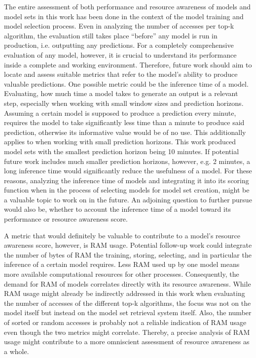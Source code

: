 The entire assessment of both performance and resource awareness of models and model sets in this work has been done in the context of the model training and model selection process. Even in analyzing the number of accesses per top-k algorithm, the evaluation still takes place “before” any model is run in production, i.e. outputting any predictions. For a completely comprehensive evaluation of any model, however, it is crucial to understand its performance inside a complete and working environment. Therefore, future work should aim to locate and assess suitable metrics that refer to the model's ability to produce valuable predictions. One possible metric could be the inference time of a model. Evaluating, how much time a model takes to generate an output is a relevant step, especially when working with small window sizes and prediction horizons. Assuming a certain model is supposed to produce a prediction every minute, requires the model to take significantly less time than a minute to produce said prediction, otherwise its informative value would be of no use. This additionally applies to when working with small prediction horizons. This work produced model sets with the smallest prediction horizon being 10 minutes. If potential future work includes much smaller prediction horizons, however, e.g. 2 minutes, a long inference time would significantly reduce the usefulness of a model. For these reasons, analyzing the inference time of models and integrating it into its scoring function when in the process of selecting models for model set creation, might be a valuable topic to work on in the future. An adjoining question to further pursue would also be, whether to account the inference time of a model toward its performance or resource awareness score. 

A metric that would definitely be valuable to contribute to a model's resource awareness score, however, is RAM usage. Potential follow-up work could integrate the number of bytes of RAM the training, storing, selecting, and in particular the inference of a certain model requires. Less RAM used up by one model means more available computational resources for other processes. Consequently, the demand for RAM of models correlates directly with its resource awareness. While RAM usage might already be indirectly addressed in this work when evaluating the number of accesses of the different top-k algorithms, the focus was not on the model itself but instead on the model set retrieval system itself. Also, the number of sorted or random accesses is probably not a reliable indication of RAM usage even though the two metrics might correlate. Thereby, a precise analysis of RAM usage might contribute to a more omniscient assessment of resource awareness as a whole.

